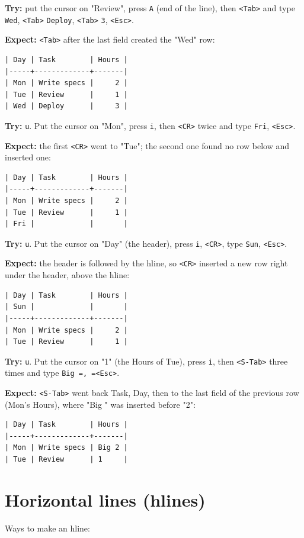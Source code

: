 \textbf{Try:} put the cursor on "Review", press \texttt{A} (end of the line), then
\texttt{<Tab>} and type \texttt{Wed}, \texttt{<Tab>} \texttt{Deploy}, \texttt{<Tab>} \texttt{3}, \texttt{<Esc>}.

\textbf{Expect:} \texttt{<Tab>} after the last field created the "Wed" row:
\begin{verbatim}
| Day | Task        | Hours |
|-----+-------------+-------|
| Mon | Write specs |     2 |
| Tue | Review      |     1 |
| Wed | Deploy      |     3 |
\end{verbatim}

\textbf{Try:} \texttt{u}. Put the cursor on "Mon", press \texttt{i}, then \texttt{<CR>} twice and type
\texttt{Fri}, \texttt{<Esc>}.

\textbf{Expect:} the first \texttt{<CR>} went to "Tue"; the second one found no row below
and inserted one:
\begin{verbatim}
| Day | Task        | Hours |
|-----+-------------+-------|
| Mon | Write specs |     2 |
| Tue | Review      |     1 |
| Fri |             |       |
\end{verbatim}

\textbf{Try:} \texttt{u}. Put the cursor on "Day" (the header), press \texttt{i}, \texttt{<CR>}, type
\texttt{Sun}, \texttt{<Esc>}.

\textbf{Expect:} the header is followed by the hline, so \texttt{<CR>} inserted a new row
right under the header, above the hline:
\begin{verbatim}
| Day | Task        | Hours |
| Sun |             |       |
|-----+-------------+-------|
| Mon | Write specs |     2 |
| Tue | Review      |     1 |
\end{verbatim}

\textbf{Try:} \texttt{u}. Put the cursor on "1" (the Hours of Tue), press \texttt{i}, then
\texttt{<S-Tab>} three times and type \texttt{Big =, =<Esc>}.

\textbf{Expect:} \texttt{<S-Tab>} went back Task, Day, then to the last field of the
previous row (Mon's Hours), where "Big " was inserted before "2":
\begin{verbatim}
| Day | Task        | Hours |
|-----+-------------+-------|
| Mon | Write specs | Big 2 |
| Tue | Review      | 1     |
\end{verbatim}
\section{Horizontal lines (hlines)}
\label{sec:orgb72b707}
Ways to make an hline:

